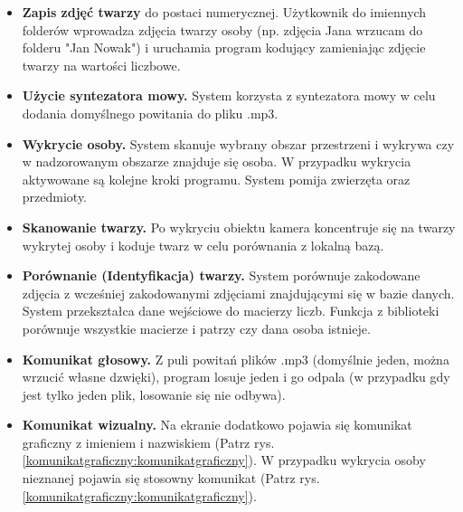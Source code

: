 \documentclass[a4paper,12pt,reqno]{article}
\begin{document}
\begin{itemize}
	\item \textbf{Zapis zdjęć twarzy} do postaci numerycznej. Użytkownik do imiennych folderów wprowadza zdjęcia twarzy osoby (np. zdjęcia Jana wrzucam do folderu "Jan Nowak") i uruchamia program kodujący zamieniając zdjęcie twarzy na wartości liczbowe.
	\item \textbf{Użycie syntezatora mowy.} System korzysta z syntezatora mowy w celu dodania domyślnego powitania do pliku .mp3.
	\item \textbf{Wykrycie osoby.} System skanuje wybrany obszar przestrzeni i wykrywa czy w nadzorowanym obszarze znajduje się osoba. W przypadku wykrycia aktywowane są kolejne kroki programu. System pomija zwierzęta oraz przedmioty.
	\item \textbf{Skanowanie  twarzy.} Po wykryciu obiektu kamera koncentruje się na twarzy wykrytej osoby i koduje twarz w celu porównania z lokalną bazą.
	\item \textbf{Porównanie (Identyfikacja) twarzy.} System porównuje zakodowane zdjęcia z wcześniej zakodowanymi zdjęciami znajdującymi się w bazie danych. System przekształca dane wejściowe do macierzy liczb. Funkcja z biblioteki porównuje wszystkie macierze i patrzy czy dana osoba istnieje.
	\item \textbf{Komunikat głosowy.} Z puli powitań plików .mp3 (domyślnie jeden, można wrzucić własne dzwięki), program losuje jeden i go odpala (w przypadku gdy jest tylko jeden plik, losowanie się nie odbywa).
	\item \textbf{Komunikat wizualny.} Na ekranie dodatkowo pojawia się komunikat graficzny z imieniem i nazwiskiem (Patrz rys. \ref{komunikatgraficzny:komunikatgraficzny}). W przypadku wykrycia osoby nieznanej pojawia się stosowny komunikat (Patrz rys. \ref{komunikatgraficzny:komunikatgraficzny}).
\end{itemize}
\end{document}
